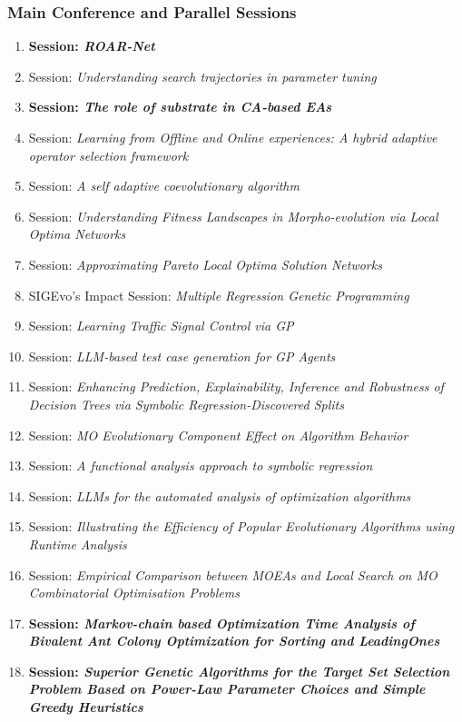 \documentclass[11pt, letterpaper, oneside]{article}
\begin{document}
\subsubsection{Main Conference and Parallel Sessions}

\begin{enumerate}
    \item \textbf{Session: \textit{ROAR-Net}}
    \item Session: \textit{Understanding search trajectories in parameter tuning}
    \item \textbf{Session: \textit{The role of substrate in CA-based EAs}}
    \item Session: \textit{Learning from Offline and Online experiences: A hybrid adaptive operator selection framework}
    \item {Session: \textit{A self adaptive coevolutionary algorithm}}
    \item Session: \textit{Understanding Fitness Landscapes in Morpho-evolution via Local Optima Networks}
    \item Session: \textit{Approximating Pareto Local Optima Solution Networks}
    \item SIGEvo's Impact Session: \textit{Multiple Regression Genetic Programming}
    \item Session: \textit{Learning Traffic Signal Control via GP}
    \item Session: \textit{LLM-based test case generation for GP Agents}
    \item Session: \textit{Enhancing Prediction, Explainability, Inference and Robustness of Decision Trees via Symbolic Regression-Discovered Splits}
    \item Session: \textit{MO Evolutionary Component Effect on Algorithm Behavior}
    \item Session: \textit{A functional analysis approach to symbolic regression}
    \item Session: \textit{LLMs for the automated analysis of optimization algorithms}
    \item Session: \textit{Illustrating the Efficiency of Popular Evolutionary Algorithms using Runtime Analysis}
    \item Session: \textit{Empirical Comparison between MOEAs and Local Search on MO Combinatorial Optimisation Problems}
    \item \textbf{Session: \textit{Markov-chain based Optimization Time Analysis of Bivalent Ant Colony Optimization for Sorting and LeadingOnes}}
    \item \textbf{Session: \textit{Superior Genetic Algorithms for the Target Set Selection Problem Based on Power-Law Parameter Choices and Simple Greedy Heuristics}}

\end{enumerate}
\end{document}
